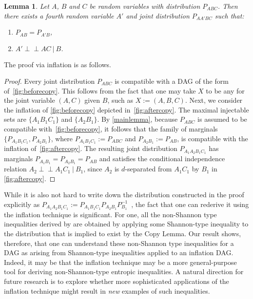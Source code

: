 \documentclass[aps,english,superscriptaddress,onecolumn,twoside,longbibliography,pra,floatfix,fleqn,nofootinbib]{revtex4-1}%
\newcommand*{\tblue}[1]{{\color{MidnightBlue}{\textbf{#1}}}}
\newtheorem{lemma}[theorem]{Lemma}
\theoremstyle{definition}
\newcounter{example}[section]
\newcommand{\indep}{\cramp{\perp\!\!\!\!\perp}} %
\newcommand{\cramp}[1]{\ensuremath{\mathord{#1}}}
\begin{document}
\begin{lemma}
	Let $A$, $B$ and $C$ be random variables with distribution $P_{ABC}$. Then there exists a fourth random variable $A'$ and joint distribution $P_{AA'BC}$ such that:
	\begin{enumerate}
		\item $P_{AB} = P_{A'B}$,
		\item $A' \indep AC \:|\: B$.
	\label{copylemma}
	\end{enumerate}
\end{lemma}

The proof via inflation is as follows.
\begin{proof}
Every joint distribution $P_{ABC}$ is compatible with a DAG of the form of~\cref{fig:beforecopy}.  This follows from the fact that one may take $X$ to be any \tblue{sufficient statistic} for the joint variable $(A,C)$ given $B$, such as $X := (A,B,C)$.  Next, we consider the inflation of \cref{fig:beforecopy} depicted in~\cref{fig:aftercopy}. The maximal injectable sets are $\{ A_1 B_1 C_1\}$ and $\{A_2 B_1\}$.  By \cref{mainlemma}, because $P_{ABC}$ is assumed to be compatible with~\cref{fig:beforecopy}, it follows that the family of marginals $\{ P_{A_1 B_1 C_1}, P_{A_2 B_1}\}$, where $P_{A_1 B_1 C_1}:= P_{A B C}$ and $P_{A_2 B_1} := P_{AB}$, is compatible with the inflation of~\cref{fig:aftercopy}. The resulting joint distribution $P_{A_1 A_2 B_1 C_1}$ has marginals $P_{A_1 B_1}= P_{A_2 B_1} =P_{AB}$ and satisfies the conditional independence relation $A_2 \indep A_1 C_1 \:|\: B_1$, since $A_2$ is $d$-separated from $A_1 C_1$ by $B_1$ in \cref{fig:aftercopy}.
\end{proof}

While it is also not hard to write down the distribution constructed in the proof explicitly as $P_{A_1 A_2 B_1 C_1} := P_{A_1 B_1 C_1} P_{A_2 B_1} P_{B_1}^{-1}$~\cite[Lemma~15.8]{yeung_network_2008}, the fact that one can rederive it using the inflation technique is significant.  For one, all the non-Shannon type inequalities derived by \citet{zeger_2011_nonshannon} are obtained by applying some Shannon-type inequality to the distribution that is implied to exist by the Copy Lemma.  Our result shows, therefore, that one can understand these non-Shannon type inequalities for a DAG as arising from Shannon-type inequalities applied to an inflation DAG.  Indeed, it may be that the inflation technique may be a more general-purpose tool for deriving non-Shannon-type entropic inequalities.  A natural direction for future research is to explore whether more sophisticated applications of the inflation technique might result  in \emph{new} examples of such inequalities. 
\end{document}
